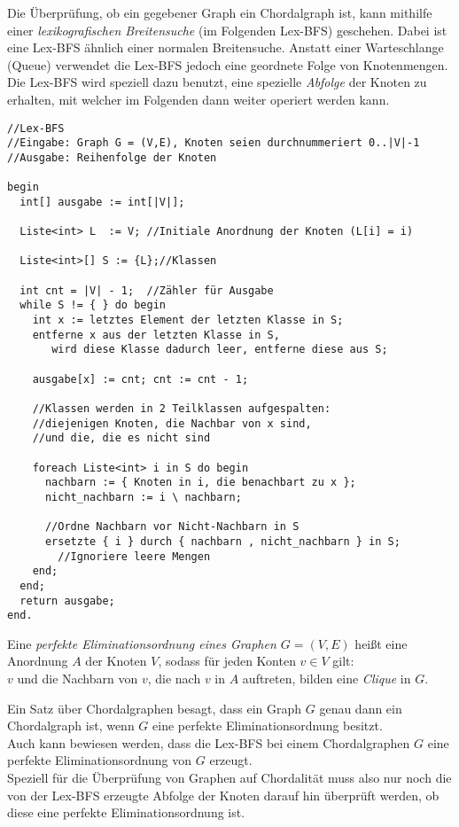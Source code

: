 Die Überprüfung, ob ein gegebener Graph ein Chordalgraph ist, kann mithilfe einer \emph{lexikografischen Breitensuche} (im Folgenden Lex-BFS) geschehen. Dabei ist eine Lex-BFS ähnlich einer normalen Breitensuche. Anstatt einer Warteschlange (Queue) verwendet die Lex-BFS jedoch eine geordnete Folge von Knotenmengen. Die Lex-BFS wird speziell dazu benutzt, eine spezielle \emph{Abfolge} der Knoten zu erhalten, mit welcher im Folgenden dann weiter operiert werden kann.

\lstset{language=[Sharp]C}
\begin{lstlisting}
//Lex-BFS
//Eingabe: Graph G = (V,E), Knoten seien durchnummeriert 0..|V|-1
//Ausgabe: Reihenfolge der Knoten

begin
  int[] ausgabe := int[|V|];
  
  Liste<int> L	:= V; //Initiale Anordnung der Knoten (L[i] = i)
  
  Liste<int>[] S := {L};//Klassen
    
  int cnt = |V| - 1;  //Zähler für Ausgabe
  while S != { } do begin
    int x := letztes Element der letzten Klasse in S;
    entferne x aus der letzten Klasse in S,
       wird diese Klasse dadurch leer, entferne diese aus S;
  	
    ausgabe[x] := cnt; cnt := cnt - 1;
    
    //Klassen werden in 2 Teilklassen aufgespalten:
    //diejenigen Knoten, die Nachbar von x sind, 
    //und die, die es nicht sind
 
    foreach Liste<int> i in S do begin
      nachbarn := { Knoten in i, die benachbart zu x };
      nicht_nachbarn := i \ nachbarn;
    	
      //Ordne Nachbarn vor Nicht-Nachbarn in S    
      ersetzte { i } durch { nachbarn , nicht_nachbarn } in S;
   	    //Ignoriere leere Mengen
    end;
  end;
  return ausgabe;
end.
\end{lstlisting}

Eine \emph{perfekte Eliminationsordnung eines Graphen $G = (V,E)$} heißt eine Anordnung $A$ der Knoten $V$, sodass für jeden Konten $v \in V$ gilt:\\
$v$ und die Nachbarn von $v$, die nach $v$ in $A$ auftreten, bilden eine \emph{Clique} in $G$.

Ein Satz über Chordalgraphen besagt, dass ein Graph $G$ genau dann ein Chordalgraph ist, wenn $G$ eine perfekte Eliminationsordnung besitzt.\\
Auch kann bewiesen werden, dass die Lex-BFS bei einem Chordalgraphen $G$ eine perfekte Eliminationsordnung von $G$ erzeugt.\\
Speziell für die Überprüfung von Graphen auf Chordalität muss also nur noch die von der Lex-BFS erzeugte Abfolge der Knoten darauf hin überprüft werden, ob diese eine perfekte Eliminationsordnung ist.

